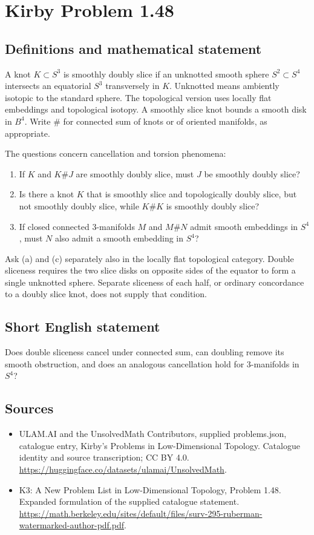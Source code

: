 \documentclass[11pt,a4paper]{article}
\begin{document}
\section*{Kirby Problem 1.48}\label{statement}

\subsection{Definitions and mathematical statement}
A knot $K\subset S^3$ is smoothly doubly slice if an unknotted smooth sphere
$S^2\subset S^4$ intersects an equatorial $S^3$ transversely in $K$. Unknotted
means ambiently isotopic to the standard sphere. The topological version uses
locally flat embeddings and topological isotopy. A smoothly slice knot bounds
a smooth disk in $B^4$. Write $\#$ for connected sum of knots or of oriented
manifolds, as appropriate.

The questions concern cancellation and torsion phenomena:
\begin{enumerate}
\item If $K$ and $K\#J$ are smoothly doubly slice, must $J$ be smoothly doubly slice?
\item Is there a knot $K$ that is smoothly slice and topologically doubly slice,
but not smoothly doubly slice, while $K\#K$ is smoothly doubly slice?
\item If closed connected $3$-manifolds $M$ and $M\#N$ admit smooth embeddings
in $S^4$, must $N$ also admit a smooth embedding in $S^4$?
\end{enumerate}
Ask (a) and (c) separately also in the locally flat topological category.
Double sliceness requires the two slice disks on opposite sides of the equator
to form a single unknotted sphere. Separate sliceness of each half, or ordinary
concordance to a doubly slice knot, does not supply that condition.
\subsection{Short English statement}
Does double sliceness cancel under connected sum, can doubling remove its smooth obstruction, and does an analogous cancellation hold for $3$-manifolds in $S^4$?
\subsection{Sources}
\begin{itemize}
\item[S1] ULAM.AI and the UnsolvedMath Contributors, supplied problems.json, catalogue entry, Kirby's Problems in Low-Dimensional Topology. Catalogue identity and source transcription; CC BY 4.0.
\url{https://huggingface.co/datasets/ulamai/UnsolvedMath}.
\item[S2] K3: A New Problem List in Low-Dimensional Topology, Problem 1.48. Expanded formulation of the supplied catalogue statement.
\url{https://math.berkeley.edu/sites/default/files/surv-295-ruberman-watermarked-author-pdf.pdf}.
\end{itemize}
\end{document}
